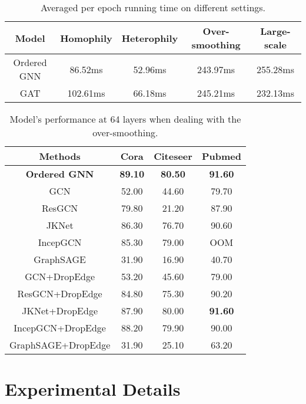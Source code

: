 \documentclass{article}
\begin{document}
\begin{table}
\caption{Averaged per epoch running time on different settings.}
\label{table.runtime}
\centering
\begin{tabular}{c|cccc}

\toprule
Model & Homophily & Heterophily & Over-smoothing & Large-scale \\
\midrule
Ordered GNN  & 86.52ms  & 52.96ms  & 243.97ms  & 255.28ms  \\
GAT & 102.61ms  & 66.18ms  & 245.21ms  & 232.13ms  \\
\bottomrule

\end{tabular}
\end{table}



\begin{table}
\caption{Model's performance at 64 layers when dealing with the over-smoothing.}
\label{table.64layers}
\centering
\begin{tabular}{c|ccc}

\toprule
Methods & Cora & Citeseer & Pubmed \\
\midrule
\textbf{Ordered GNN} & \textbf{89.10} & \textbf{80.50} & \textbf{91.60} \\
\midrule
GCN & 52.00 & 44.60 & 79.70 \\
ResGCN & 79.80 & 21.20 & 87.90 \\
JKNet & 86.30 & 76.70 & 90.60 \\
IncepGCN & 85.30 & 79.00 & OOM \\
GraphSAGE & 31.90 & 16.90 & 40.70 \\
\midrule
GCN+DropEdge & 53.20 & 45.60 & 79.00 \\
ResGCN+DropEdge & 84.80 & 75.30 & 90.20 \\
JKNet+DropEdge & 87.90 & 80.00 & \textbf{91.60} \\
IncepGCN+DropEdge & 88.20 & 79.90 & 90.00 \\
GraphSAGE+DropEdge & 31.90 & 25.10 & 63.20 \\
\bottomrule

\end{tabular}
\end{table}


\section{Experimental Details}
\label{exp_detail}
\end{document}
